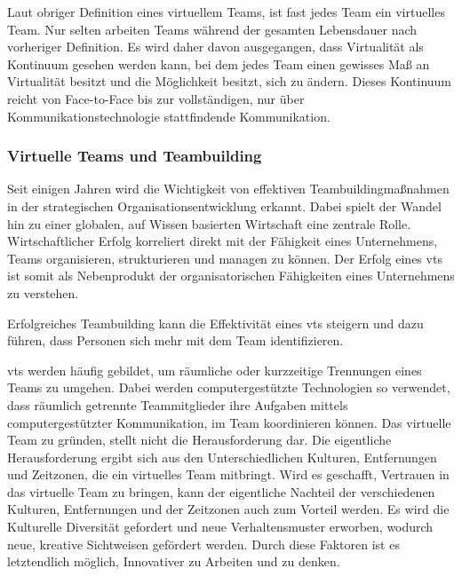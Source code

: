 \documentclass[a4paper,11pt]{article}%
\renewcommand{\\}{\vspace*{0.5\baselineskip} \newline}
\begin{document}
Laut obriger Definition eines virtuellem Teams, ist fast jedes Team ein virtuelles Team. Nur selten arbeiten Teams während der gesamten Lebensdauer nach vorheriger Definition. Es wird daher davon ausgegangen, dass Virtualität als Kontinuum gesehen werden kann, bei dem jedes Team einen gewisses Maß an Virtualität besitzt und die Möglichkeit besitzt, sich zu ändern. Dieses Kontinuum reicht von Face-to-Face bis zur vollständigen, nur über Kommunikationstechnologie stattfindende Kommunikation. \cite{martins2004virtual}


\subsubsection{Virtuelle Teams und Teambuilding}

Seit einigen Jahren wird die Wichtigkeit von effektiven Teambuildingmaßnahmen in der strategischen Organisationsentwicklung erkannt. Dabei spielt der Wandel hin zu einer globalen, auf Wissen basierten Wirtschaft eine zentrale Rolle. \citep{belbin2011management} \citep[p.7]{katzenbach2015wisdom}
Wirtschaftlicher Erfolg korreliert direkt mit der Fähigkeit eines Unternehmens, Teams organisieren, strukturieren und managen zu können. \citep{pasmore1993designing}
Der Erfolg eines \ac{vts} ist somit als Nebenprodukt der organisatorischen Fähigkeiten eines Unternehmens zu verstehen. \citep[Chapter.5]{kling1994social}

Erfolgreiches Teambuilding kann die Effektivität eines \ac{vts} steigern und dazu führen, dass Personen sich mehr mit dem Team identifizieren. \citep{kaiser2000student}

\ac{vts} werden häufig gebildet, um räumliche oder kurzzeitige Trennungen eines Teams zu umgehen. Dabei werden computergestützte Technologien so verwendet, dass räumlich getrennte Teammitglieder ihre Aufgaben mittels computergestützter Kommunikation, im Team koordinieren können. \citep[p. 117-119]{peters2007identifying} \citep[p. 1-2]{cascio2003leadership}
Das virtuelle Team zu gründen, stellt nicht die Herausforderung dar. Die eigentliche Herausforderung ergibt sich aus den Unterschiedlichen Kulturen, Entfernungen und Zeitzonen, die ein virtuelles Team mitbringt. Wird es geschafft, Vertrauen in das virtuelle Team zu bringen, kann der eigentliche Nachteil der verschiedenen Kulturen, Entfernungen und der Zeitzonen auch zum Vorteil werden. Es wird die Kulturelle Diversität gefordert und neue Verhaltensmuster erworben, wodurch neue, kreative Sichtweisen gefördert werden. Durch diese Faktoren ist es letztendlich möglich, Innovativer zu Arbeiten und zu denken. \citep{dyer1995team} \citep[p.405-416]{milliken1996searching}
\end{document}

